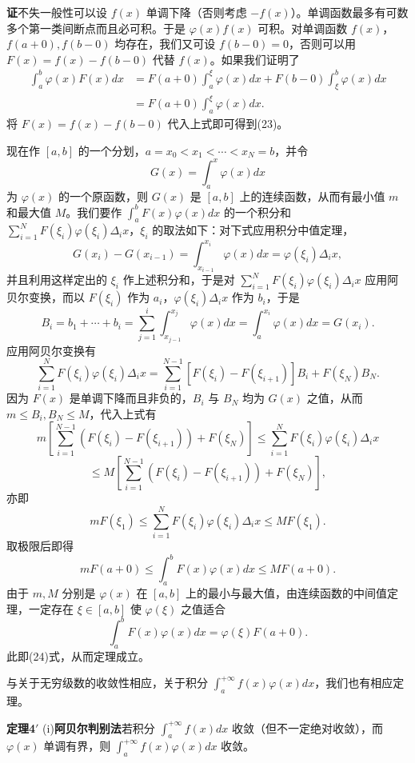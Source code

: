 \noindent\textbf{证}\quad 不失一般性可以设 $f(x)$ 单调下降（否则考虑 $-f(x)$）。单调函数最多有可数多个第一类间断点而且必可积。于是 $\varphi(x)f(x)$ 可积。对单调函数 $f(x)$，$f(a+0),f(b-0)$ 均存在，我们又可设 $f(b-0)=0$，否则可以用 $F(x)=f(x)-f(b-0)$ 代替 $f(x)$。如果我们证明了
\begin{equation}
 \begin{aligned}
 \int_a^b\varphi(x)F(x)dx
 &=F(a+0)\int_a^{\xi}\varphi(x)dx+F(b-0)\int_{\xi}^{b}\varphi(x)dx\\
 &=F(a+0)\int_a^{\xi}\varphi(x)dx.
 \end{aligned}
 \tag{24}
\end{equation}
将 $F(x)=f(x)-f(b-0)$ 代入上式即可得到(23)。

现在作 $[a,b]$ 的一个分划，$a=x_0<x_1<\cdots<x_N=b$，并令
\[
 G(x)=\int_a^x\varphi(x)dx
\]
为 $\varphi(x)$ 的一个原函数，则 $G(x)$ 是 $[a,b]$ 上的连续函数，从而有最小值 $m$ 和最大值 $M$。我们要作 $\int_a^bF(x)\varphi(x)dx$ 的一个积分和 $\sum_{i=1}^{N}F(\xi_i)\varphi(\xi_i)\Delta_ix$，$\xi_i$ 的取法如下：对下式应用积分中值定理，
\[
 G(x_i)-G(x_{i-1})=\int_{x_{i-1}}^{x_i}\varphi(x)dx=\varphi(\xi_i)\Delta_ix,
\]
并且利用这样定出的 $\xi_i$ 作上述积分和，于是对 $\sum_{i=1}^{N}F(\xi_i)\varphi(\xi_i)\Delta_ix$ 应用阿贝尔变换，而以 $F(\xi_i)$ 作为 $a_i$，$\varphi(\xi_i)\Delta_ix$ 作为 $b_i$，于是
\[
 B_i=b_1+\cdots+b_i=\sum_{j=1}^{i}\int_{x_{j-1}}^{x_j}\varphi(x)dx
 =\int_a^{x_i}\varphi(x)dx=G(x_i).
\]
应用阿贝尔变换有
\[
 \sum_{i=1}^{N}F(\xi_i)\varphi(\xi_i)\Delta_ix
 =\sum_{i=1}^{N-1}[F(\xi_i)-F(\xi_{i+1})]B_i+F(\xi_N)B_N.
\]
因为 $F(x)$ 是单调下降而且非负的，$B_i$ 与 $B_N$ 均为 $G(x)$ 之值，从而 $m\le B_i,B_N\le M$，代入上式有
\[
 m\left[\sum_{i=1}^{N-1}(F(\xi_i)-F(\xi_{i+1}))+F(\xi_N)\right]
 \le\sum_{i=1}^{N}F(\xi_i)\varphi(\xi_i)\Delta_ix
\]
\[
 \le M\left[\sum_{i=1}^{N-1}(F(\xi_i)-F(\xi_{i+1}))+F(\xi_N)\right],
\]
亦即
\[
 mF(\xi_1)\le\sum_{i=1}^{N}F(\xi_i)\varphi(\xi_i)\Delta_ix\le MF(\xi_1).
\]
取极限后即得
\[
 mF(a+0)\le\int_a^bF(x)\varphi(x)dx\le MF(a+0).
\]
由于 $m,M$ 分别是 $\varphi(x)$ 在 $[a,b]$ 上的最小与最大值，由连续函数的中间值定理，一定存在 $\xi\in[a,b]$ 使 $\varphi(\xi)$ 之值适合
\[
 \int_a^bF(x)\varphi(x)dx=\varphi(\xi)F(a+0).
\]
此即(24)式，从而定理成立。

与关于无穷级数的收敛性相应，关于积分 $\int_a^{+\infty}f(x)\varphi(x)dx$，我们也有相应定理。

\noindent\textbf{定理4$'$}\quad
(i)\textbf{阿贝尔判别法}\quad 若积分 $\int_a^{+\infty}f(x)dx$ 收敛（但不一定绝对收敛），而 $\varphi(x)$ 单调有界，则 $\int_a^{+\infty}f(x)\varphi(x)dx$ 收敛。

